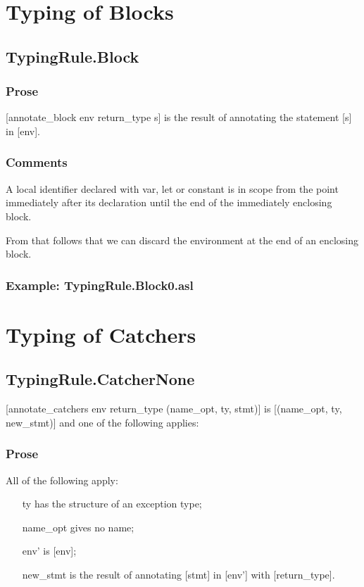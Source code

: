 \documentclass{book}
\begin{document}
\section{Typing of Blocks}

\subsection{TypingRule.Block}
    
    \subsubsection{Prose}
    [annotate\_block env return\_type s] is the result of annotating the
    statement [s] in [env].

    \subsubsection{Comments}
    A local identifier declared with var, let or constant is in scope
from the point immediately after its declaration until the end of the
immediately enclosing block.

    From that follows that we can discard the environment at the end of
an enclosing block.
    
    \subsubsection{Example: TypingRule.Block0.asl}

\section{Typing of Catchers}
  
\subsection{TypingRule.CatcherNone}
  [annotate\_catchers env return\_type (name\_opt, ty, stmt)] is [(name\_opt, ty,
  new\_stmt)] and one of the following applies:
 
    \subsubsection{Prose}
    All of the following apply:
   \begin{itemize}
   \item [ty] has the structure of an exception type;
   \item [name\_opt] gives no name;
   \item [env'] is [env];
   \item [new\_stmt] is the result of annotating [stmt] in [env'] with [return\_type].
   \end{itemize}
\end{document}
